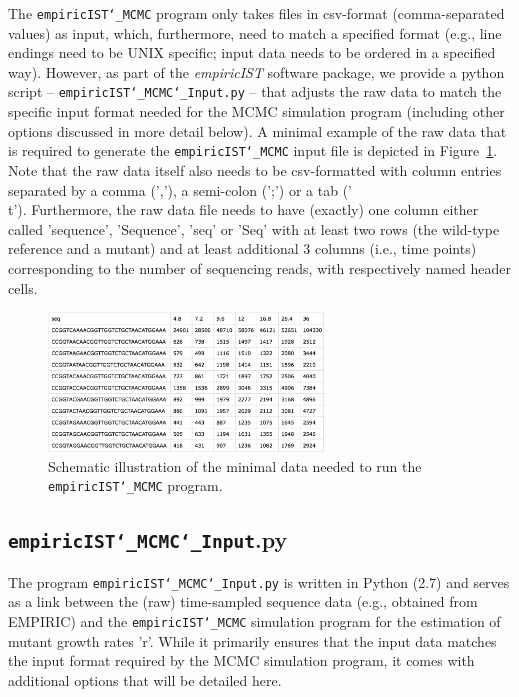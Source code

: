 \documentclass[12pt,a4paper]{scrartcl}
\begin{document}
The \texttt{empiricIST\char`_MCMC} program only takes files in csv-format (comma-separated values) as input, which, furthermore, need to match a specified format (e.g., line endings need to be UNIX specific; input data needs to be ordered in a specified way). However, as part of the \emph{empiricIST} software package, we provide a python script -- \texttt{empiricIST\char`_MCMC\char`_Input.py} -- that adjusts the raw data to match the specific input format needed for the MCMC simulation program (including other options discussed in more detail below). A minimal example of the raw data that is required to generate the \texttt{empiricIST\char`_MCMC} input file is depicted in Figure~\ref{fig:RawInput}. Note that the raw data itself also needs to be csv-formatted with column entries separated by a comma (','), a semi-colon (';') or a tab ('\\t').
Furthermore, the raw data file needs to have (exactly) one column either called 'sequence', 'Sequence', 'seq' or 'Seq' with at least two rows (the wild-type reference and a mutant) and at least additional 3 columns (i.e., time points) corresponding to the number of sequencing reads, with respectively named header cells.

\begin{figure}
\centering \includegraphics[width=0.65\textwidth]{RawDataInput.png}
\caption{Schematic illustration of the minimal data needed to run the \texttt{empiricIST\char`_MCMC} program. \label{fig:RawInput}}
\end{figure}

\subsection{\texttt{empiricIST\char`_MCMC\char`_Input}.py}

The program \texttt{empiricIST\char`_MCMC\char`_Input.py} is written in Python (2.7) and serves as a link between the (raw) time-sampled sequence data (e.g., obtained from EMPIRIC) and the \texttt{empiricIST\char`_MCMC} simulation program for the estimation of mutant growth rates 'r'. While it primarily ensures that the input data matches the input format required by the MCMC simulation program, it comes with additional options that will be detailed here.
\end{document}
